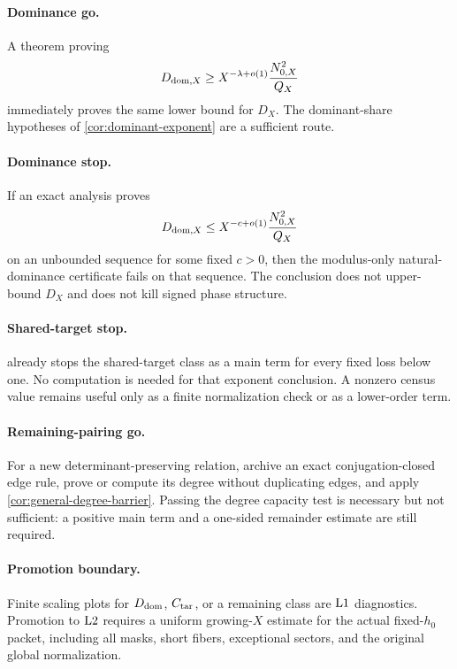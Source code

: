 \paragraph{Dominance go.}
A theorem proving
\[
 D_{\mathrm{dom},X}
 \ge
 X^{-\lambda+o(1)}
 \frac{N_{0,X}^2}{Q_X}
\]
immediately proves the same lower bound for \(D_X\).  The
dominant-share hypotheses of
\cref{cor:dominant-exponent} are a sufficient route.

\paragraph{Dominance stop.}
If an exact analysis proves
\[
 D_{\mathrm{dom},X}
 \le
 X^{-c+o(1)}
 \frac{N_{0,X}^2}{Q_X}
\]
on an unbounded sequence for some fixed \(c>0\), then the
modulus-only natural-dominance certificate fails on that sequence.
The conclusion does not upper-bound \(D_X\) and does not kill signed
phase structure.

\paragraph{Shared-target stop.}
 already stops the shared-target class as a
main term for every fixed loss below one.  No computation is needed
for that exponent conclusion.  A nonzero census value remains useful
only as a finite normalization check or as a lower-order term.

\paragraph{Remaining-pairing go.}
For a new determinant-preserving relation, archive an exact
conjugation-closed edge rule, prove or compute its degree without
duplicating edges, and apply
\cref{cor:general-degree-barrier}.  Passing the degree capacity test
is necessary but not sufficient: a positive main term and a
one-sided remainder estimate are still required.

\paragraph{Promotion boundary.}
Finite scaling plots for \(D_{\mathrm{dom}}\), \(C_{\mathrm{tar}}\), or a remaining
class are \(\mathrm{L1}\) diagnostics.  Promotion to \(\mathrm{L2}\) requires a
uniform growing-\(X\) estimate for the actual fixed-\(h_0\) packet,
including all masks, short fibers, exceptional sectors, and the
original global normalization.
